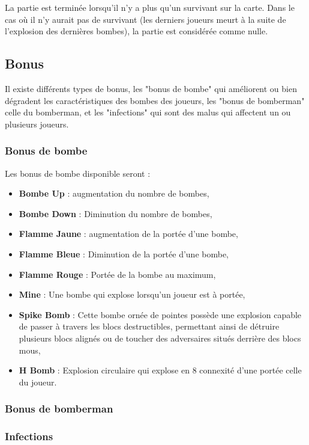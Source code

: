 La partie est terminée lorsqu'il n'y a plus qu'un survivant sur la carte. Dans le cas où il n'y aurait pas de survivant (les derniers joueurs meurt à la suite de l'explosion des dernières bombes), la partie est considérée comme nulle.

\subsection{Bonus}

Il existe différents types de bonus, les "bonus de bombe" qui améliorent ou bien dégradent les caractéristiques des bombes des joueurs, les "bonus de bomberman" celle du bomberman, et les "infections" qui sont des malus qui affectent un ou plusieurs joueurs.

\subsubsection{Bonus de bombe}

Les bonus de bombe disponible seront :
\begin{itemize}
\item \textbf{Bombe Up} : augmentation du nombre de bombes,
\item \textbf{Bombe Down} : Diminution du nombre de bombes,
\item \textbf{Flamme Jaune} : augmentation de la portée d'une bombe,
\item \textbf{Flamme Bleue} : Diminution de la portée d'une bombe,
\item \textbf{Flamme Rouge} : Portée de la bombe au maximum,
\item \textbf{Mine} : Une bombe qui explose lorsqu'un joueur est à portée,
\item \textbf{Spike Bomb} : Cette bombe ornée de pointes possède une explosion capable de passer à travers les blocs destructibles, permettant ainsi de détruire plusieurs blocs alignés ou de toucher des adversaires situés derrière des blocs mous,
\item \textbf{H Bomb} : Explosion circulaire qui explose en 8 connexité d'une portée celle du joueur.
\end{itemize}

\subsubsection{Bonus de bomberman}

\subsubsection{Infections}